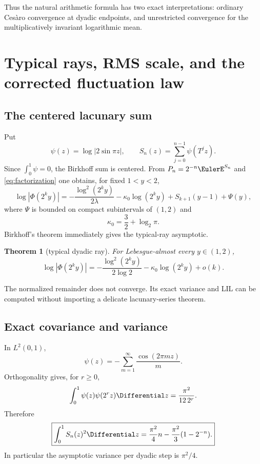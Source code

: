 \documentclass[11pt,oneside]{article}
\newtheorem{theorem}{Theorem}[section]
\theoremstyle{definition}
\theoremstyle{remark}
\newcommand{\T}{T}
\begin{document}
Thus the natural arithmetic formula has two exact interpretations: ordinary
Ces\`aro convergence at dyadic endpoints, and unrestricted convergence for the
multiplicatively invariant logarithmic mean.

\section{Typical rays, RMS scale, and the corrected fluctuation law}
\label{sec:typical}

\subsection{The centered lacunary sum}

Put
\begin{equation}
 \psi(z)=\log|2\sin\pi z|,
 \qquad
 S_n(z)=\sum_{j=0}^{n-1}\psi(\T^jz).
 \label{eq:psi-S}
\end{equation}
Since \(\int_0^1\psi=0\), the Birkhoff sum is centered.  From
\(P_n=2^{-n}\EulerE^{S_n}\) and \eqref{eq:factorization} one obtains, for fixed
\(1<y<2\),
\begin{equation}
 \log|\Phi(2^ky)|
 =-\frac{\log^2(2^ky)}{2\lambda}
  -\kappa_0\log(2^ky)
  +S_{k+1}(y-1)+\Psi(y),
 \label{eq:ray-exact}
\end{equation}
where \(\Psi\) is bounded on compact subintervals of \((1,2)\) and
\begin{equation}
 \kappa_0=\frac32+\log_2\pi.
 \label{eq:kappa0}
\end{equation}
Birkhoff's theorem immediately gives the typical-ray asymptotic.

\begin{theorem}[typical dyadic ray]
\label{thm:typical-ray}
For Lebesgue-almost every \(y\in(1,2)\),
\begin{equation}
 \log|\Phi(2^ky)|
 =-\frac{\log^2(2^ky)}{2\log2}
  -\kappa_0\log(2^ky)+o(k).
 \label{eq:typical-ray}
\end{equation}
\end{theorem}

The normalized remainder does not converge.  Its exact variance and LIL can be
computed without importing a delicate lacunary-series theorem.

\subsection{Exact covariance and variance}

In \(L^2(0,1)\),
\begin{equation}
 \psi(z)=-\sum_{m=1}^{\infty}\frac{\cos(2\pi mz)}{m}.
 \label{eq:psi-fourier}
\end{equation}
Orthogonality gives, for \(r\ge0\),
\begin{equation}
 \int_0^1\psi(z)\psi(2^rz)\Differential z
 =\frac{\pi^2}{12\,2^r}.
 \label{eq:covariance}
\end{equation}
Therefore
\begin{equation}
 \boxed{
 \int_0^1S_n(z)^2\Differential z
 =\frac{\pi^2}{4}n-\frac{\pi^2}{3}(1-2^{-n}).}
 \label{eq:exact-variance}
\end{equation}
In particular the asymptotic variance per dyadic step is \(\pi^2/4\).
\end{document}

